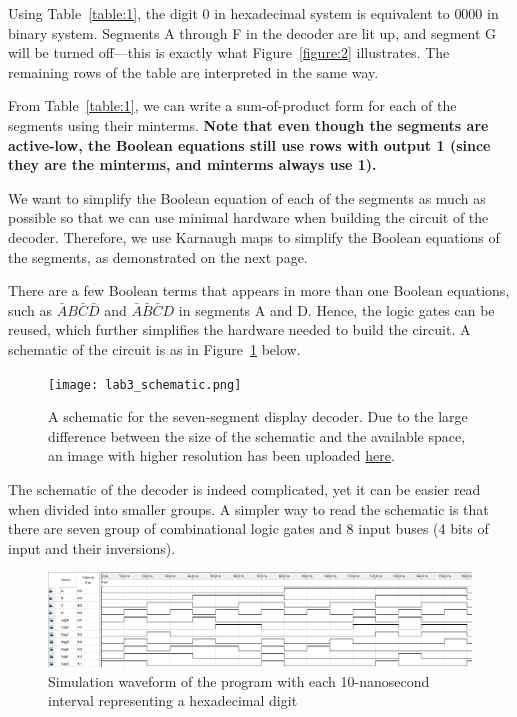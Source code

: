 \documentclass[12pt]{article}
\begin{document}
Using Table~\ref{table:1}, the digit $0$ in hexadecimal system is equivalent to $0000$ in binary system. Segments A through F in the decoder are lit up, and segment G will be turned off---this is exactly what Figure~\ref{figure:2} illustrates. The remaining rows of the table are interpreted in the same way.

From Table~\ref{table:1}, we can write a sum-of-product form for each of the segments using their minterms. \textbf{Note that even though the segments are active-low, the Boolean equations still use rows with output 1 (since they are the minterms, and minterms always use 1).}

We want to simplify the Boolean equation of each of the segments as much as possible so that we can use minimal hardware when building the circuit of the decoder. Therefore, we use Karnaugh maps to simplify the Boolean equations of the segments, as demonstrated on the next page.



There are a few Boolean terms that appears in more than one Boolean equations, such as $\bar{A}B\bar{C}\bar{D}$ and $\bar{A}\bar{B}\bar{C}D$ in segments A and D. Hence, the logic gates can be reused, which further simplifies the hardware needed to build the circuit. A schematic of the circuit is as in Figure~\ref{figure:4} below.

\begin{figure}[h]
  \centering
  \texttt{[image: lab3\_schematic.png]}
  \caption{A schematic for the seven-segment display decoder. Due to the large difference between the size of the schematic and the available space, an image with higher resolution has been uploaded \href{https://i.imgur.com/jaLoZg9.jpg}{here}.}
  \label{figure:4}
\end{figure}

The schematic of the decoder is indeed complicated, yet it can be easier read when divided into smaller groups. A simpler way to read the schematic is that there are seven group of combinational logic gates and 8 input buses (4 bits of input and their inversions).

\begin{figure}[h]
  \centering
  \includegraphics[width=\textwidth]{lab3_simulation.png}
  \caption{Simulation waveform of the program with each 10-nanosecond interval representing a hexadecimal digit}
  \label{figure:5}
\end{figure}
\end{document}
